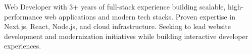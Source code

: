 \documentclass[letter,10pt]{article}
\begin{document}
Web Developer with 3+ years of full-stack experience building scalable, high-performance web applications and modern tech stacks. Proven expertise in Next.js, React, Node.js, and cloud infrastructure. Seeking to lead website development and modernization initiatives while building interactive developer experiences.
\end{document}
